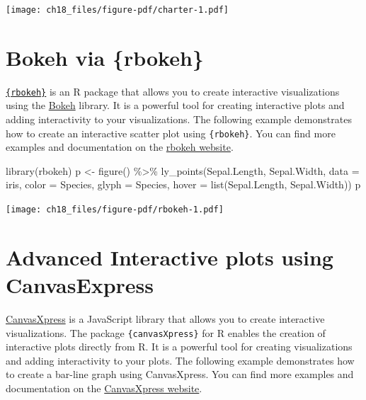 \documentclass[
  letterpaper,
  DIV=11,
  numbers=noendperiod]{scrreprt}
\newenvironment{Shaded}{\begin{snugshade}}{\end{snugshade}}
\newcommand{\AttributeTok}[1]{\textcolor[rgb]{0.40,0.45,0.13}{#1}}
\newcommand{\FunctionTok}[1]{\textcolor[rgb]{0.28,0.35,0.67}{#1}}
\newcommand{\NormalTok}[1]{\textcolor[rgb]{0.00,0.23,0.31}{#1}}
\newcommand{\OtherTok}[1]{\textcolor[rgb]{0.00,0.23,0.31}{#1}}
\newcommand{\SpecialCharTok}[1]{\textcolor[rgb]{0.37,0.37,0.37}{#1}}
\begin{document}
\texttt{[image: ch18\_files/figure-pdf/charter-1.pdf]}

\section{Bokeh via \{rbokeh\}}\label{bokeh-via-rbokeh}

\href{https://hafen.github.io/rbokeh/}{\texttt{\{rbokeh\}}} is an R
package that allows you to create interactive visualizations using the
\href{https://bokeh.org/}{Bokeh} library. It is a powerful tool for
creating interactive plots and adding interactivity to your
visualizations. The following example demonstrates how to create an
interactive scatter plot using \texttt{\{rbokeh\}}. You can find more
examples and documentation on the
\href{https://hafen.github.io/rbokeh/}{rbokeh website}.

\begin{Shaded}
\begin{Highlighting}[]
\FunctionTok{library}\NormalTok{(rbokeh)}
\NormalTok{p }\OtherTok{\textless{}{-}} \FunctionTok{figure}\NormalTok{() }\SpecialCharTok{\%\textgreater{}\%}
  \FunctionTok{ly\_points}\NormalTok{(Sepal.Length, Sepal.Width, }\AttributeTok{data =}\NormalTok{ iris,}
    \AttributeTok{color =}\NormalTok{ Species, }\AttributeTok{glyph =}\NormalTok{ Species,}
    \AttributeTok{hover =} \FunctionTok{list}\NormalTok{(Sepal.Length, Sepal.Width))}
\NormalTok{p}
\end{Highlighting}
\end{Shaded}

\texttt{[image: ch18\_files/figure-pdf/rbokeh-1.pdf]}

\section{Advanced Interactive plots using
CanvasExpress}\label{advanced-interactive-plots-using-canvasexpress}

\href{https://www.canvasxpress.org/}{CanvasXpress} is a JavaScript
library that allows you to create interactive visualizations. The
package \texttt{\{canvasXpress\}} for R enables the creation of
interactive plots directly from R. It is a powerful tool for creating
visualizations and adding interactivity to your plots. The following
example demonstrates how to create a bar-line graph using CanvasXpress.
You can find more examples and documentation on the
\href{https://www.canvasxpress.org/}{CanvasXpress website}.
\end{document}
